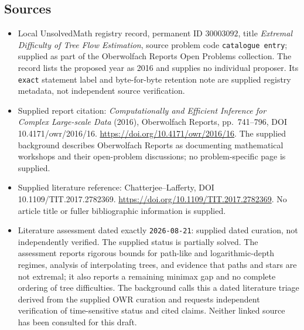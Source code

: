 \documentclass[11pt]{article}
\begin{document}
\subsection{Sources}
\begin{itemize}
\item Local UnsolvedMath registry record, permanent ID \(30003092\), title \emph{Extremal Difficulty of Tree Flow Estimation}, source problem code \texttt{catalogue entry}; supplied as part of the Oberwolfach Reports Open Problems collection. The record lists the proposed year as 2016 and supplies no individual proposer. Its \texttt{exact} statement label and byte-for-byte retention note are supplied registry metadata, not independent source verification.
\item Supplied report citation: \emph{Computationally and Efficient Inference for Complex Large-scale Data} (2016), Oberwolfach Reports, pp.\ 741--796, DOI 10.4171/owr/2016/16. \url{https://doi.org/10.4171/owr/2016/16}. The supplied background describes Oberwolfach Reports as documenting mathematical workshops and their open-problem discussions; no problem-specific page is supplied.
\item Supplied literature reference: Chatterjee--Lafferty, DOI 10.1109/TIT.2017.2782369. \url{https://doi.org/10.1109/TIT.2017.2782369}. No article title or fuller bibliographic information is supplied.
\item Literature assessment dated exactly \texttt{2026-08-21}: supplied dated curation, not independently verified. The supplied status is partially solved. The assessment reports rigorous bounds for path-like and logarithmic-depth regimes, analysis of interpolating trees, and evidence that paths and stars are not extremal; it also reports a remaining minimax gap and no complete ordering of tree difficulties. The background calls this a dated literature triage derived from the supplied OWR curation and requests independent verification of time-sensitive status and cited claims. Neither linked source has been consulted for this draft.
\end{itemize}
\end{document}
